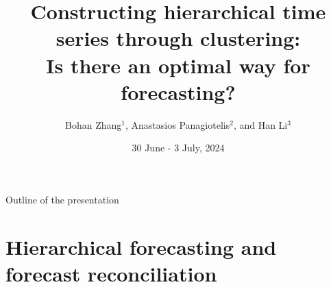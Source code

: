 \documentclass[aspectratio=169]{beamer}
\title[Constructing hierarchical time series through clustering]{Constructing hierarchical time series through clustering: \\Is there an optimal way for forecasting?}
\author[Bohan Zhang]{Bohan Zhang$^{1}$, Anastasios Panagiotelis$^{2}$, and Han Li$^{3}$} %
\institute[] %
  	{\small {$^1$ \small School of Economics and Management, Beihang University}
   \vskip 0.2cm
	\small {$^2$ Discipline of Business Analytics, Business School, University of Sydney}	
    \vskip 0.2cm
  	\small {$^3$ \small Centre for Actuarial Studies, Department of Economics, University of Melbourne}
   \vskip 0.5cm
\textbf{The 44th International Symposium on Forecasting, Dijon, France}
}
\date{30 June - 3 July, 2024} %
\begin{document}
	
\begin{frame}
\titlepage

\end{frame}
				


 
 
				


\begin{frame}{Outline of the presentation}

\tableofcontents 
\end{frame}

\section{Hierarchical forecasting and forecast reconciliation}
\end{document}
